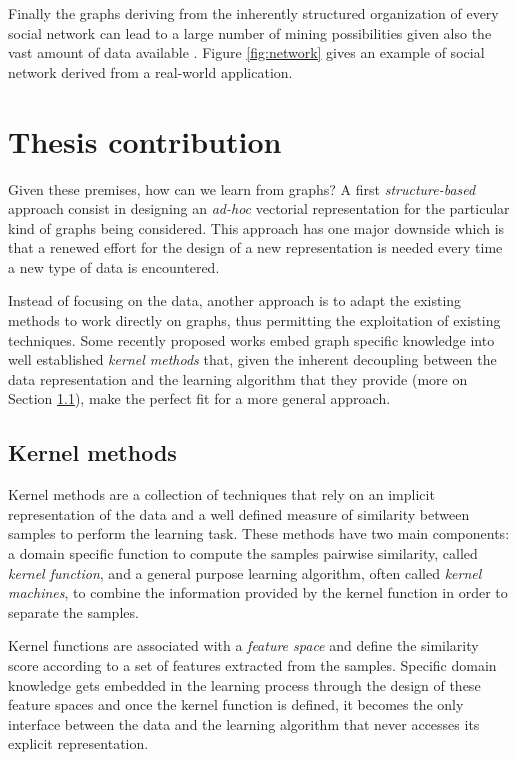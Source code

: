 Finally  the graphs deriving from the inherently structured organization of every social
network can lead to a large number of mining possibilities given also the vast
amount of data available \cite{gundecha2012mining}.
Figure \ref{fig:network} gives an example of social network derived from a real-world
application.


\section{Thesis contribution}

Given these premises, how can we learn from graphs? A first \emph{structure-based}
approach consist in designing an \emph{ad-hoc} vectorial representation for the
particular kind of graphs being considered.
This approach has one major downside which is that a renewed effort for the 
design of a new representation is needed every time a new type of data
is encountered.

Instead of focusing on the data, another approach is to adapt the existing methods
to work directly on graphs, thus permitting the exploitation of existing techniques.
Some recently proposed works \cite{DBLP:conf/sdm/MartinoNS12, NIPS2009_3813}
embed graph specific knowledge into well established \emph{kernel methods}
that, given the inherent decoupling between the data representation and the learning
algorithm that they provide (more on Section \ref{subsec:introkm}), make the
perfect fit for a more general approach.

\subsection{Kernel methods}
\label{subsec:introkm}

Kernel methods are a collection of techniques that rely on an implicit representation
of the data and a well defined measure of similarity between samples to perform
the learning task.
These methods have two main components: a domain specific function to compute the
samples pairwise similarity, called \emph{kernel function}, and a general purpose
learning algorithm, often called \emph{kernel machines}, to combine the information provided by the
kernel function in order to separate the samples.

Kernel functions are associated with a \emph{feature space} and define the similarity
score according to a set of features extracted from the samples.
Specific domain knowledge gets embedded in the learning process through the design of these
feature spaces and once the kernel function is defined, it becomes the only interface between the data
and the learning algorithm that never accesses its explicit representation.

